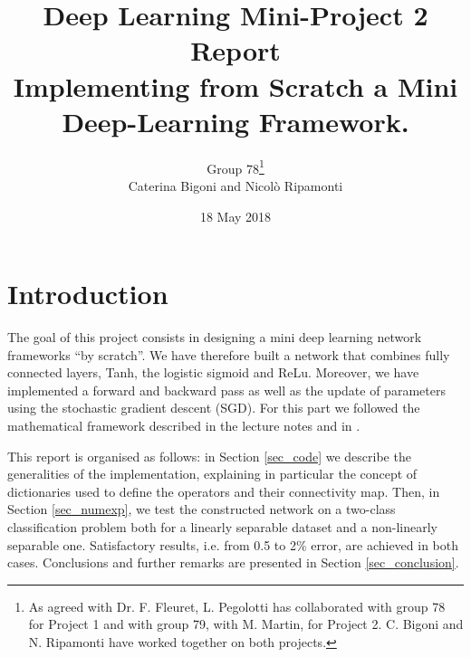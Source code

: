 \documentclass{article}
\begin{document}
\title{Deep Learning Mini-Project 2 Report \\ Implementing from Scratch a Mini Deep-Learning Framework.}
\author{Group 78\footnote{As agreed with Dr. F. Fleuret, L. Pegolotti has collaborated with group 78 for Project 1 and with group 79, with M. Martin, for Project 2. C. Bigoni and N. Ripamonti have worked together on both projects.}  \\ Caterina Bigoni and Nicol\`o Ripamonti}
\date{18 May 2018}
\maketitle





\section{Introduction}
The goal of this project consists in designing a mini deep learning network frameworks ``by scratch''. 
We have therefore built a network that combines fully connected layers, Tanh, the logistic sigmoid and ReLu. 
Moreover, we have implemented a forward and backward pass as well as the update of parameters using the stochastic gradient descent (SGD).
For this part we followed the mathematical framework described in the lecture notes \cite{lec_notes_fleuret} and in \cite{goodfellow2016deep}. 

This report is organised as follows: in Section \ref{sec_code} we describe the generalities of the implementation, explaining in particular the concept of dictionaries used to define the operators and their connectivity map. 
Then, in  Section \ref{sec_numexp}, we test the constructed network on a two-class classification problem both for a linearly separable dataset and a non-linearly separable one.
Satisfactory results, i.e. from 0.5 to 2\% error, are achieved in both cases. 
Conclusions and further remarks are presented in Section \ref{sec_conclusion}.
\end{document}
